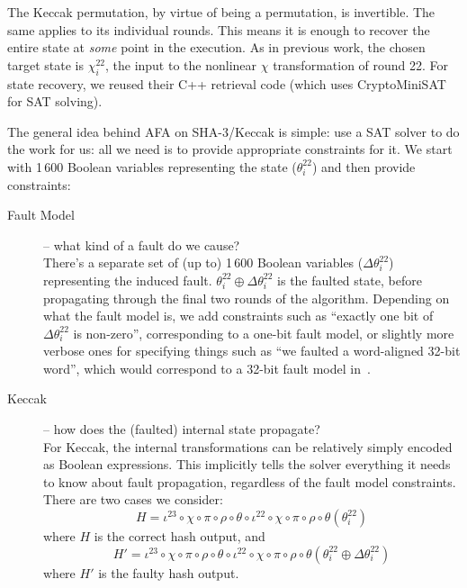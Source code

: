 \documentclass[times, utf8, diplomski]{fer}
\begin{document}
The Keccak permutation, by virtue of being a permutation, is invertible.
The same applies to its individual rounds. This means it is enough to recover
the entire state at \emph{some} point in the execution. As in previous work, the
chosen target state is $\chi^{22}_i$, the input to the nonlinear $\chi$
transformation of round 22.
For state recovery, we reused their C++ retrieval code (which uses CryptoMiniSAT
for SAT solving).

The general idea behind AFA on SHA-3/Keccak is simple: use a SAT solver to do
the work for us: all we need is to provide appropriate constraints for it.
We start with 1\,600 Boolean variables representing the state ($\theta^{22}_i$)
and then provide constraints:
\begin{description}
    \item[Fault Model] -- what kind of a fault do we cause?\\
	There's a separate set of (up to) 1\,600 Boolean variables ($\Delta\theta^{22}_i$)
    representing the induced fault. $\theta^{22}_i \oplus \Delta\theta^{22}_i$ is the
    faulted state, before propagating through the final two rounds of the algorithm.
	Depending on what the fault model is, we add constraints such as ``exactly one bit
    of $\Delta\theta^{22}_i$ is non-zero'', corresponding to a one-bit fault model, or
    slightly more verbose ones for specifying things such as ``we faulted a word-aligned
    32-bit word'', which would correspond to a 32-bit fault model in~\cite{luo2018algebraic}.

    \item[Keccak] -- how does the (faulted) internal state propagate?\\
	For Keccak, the internal transformations can be relatively simply encoded as Boolean expressions.
	This implicitly tells the solver everything it needs to know about fault propagation, regardless of
	the fault model constraints. There are two cases we consider:
	\begin{equation*}
	H= \iota^{23} \circ \chi \circ \pi \circ \rho \circ \theta \circ
	\iota^{22} \circ \chi \circ \pi \circ \rho \circ \theta(\theta^{22}_i)
	\end{equation*}
	where $H$ is the correct hash output, and
	\begin{equation*}
	H'= \iota^{23} \circ \chi \circ \pi \circ \rho \circ \theta \circ
	\iota^{22} \circ \chi \circ \pi \circ \rho \circ \theta(\theta^{22}_i \oplus \Delta\theta^{22}_i)
	\end{equation*}
	where $H'$ is the faulty hash output.


\end{description}
\end{document}
